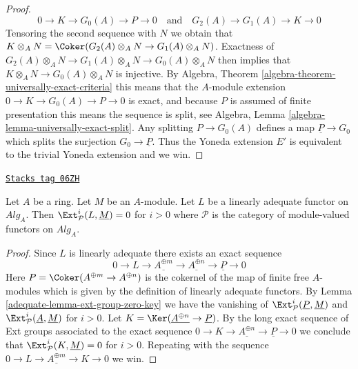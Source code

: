 \begin{proof}
$$
0 \to K \to G_0(A) \to P \to 0
\quad\text{and}\quad
G_2(A) \to G_1(A) \to K \to 0
$$
Tensoring the second sequence with $N$ we obtain that
$K \otimes_A N = \Coker(G_2(A) \otimes_A N \to G_1(A) \otimes_A N)$.
Exactness of $G_2(A) \otimes_A N \to G_1(A) \otimes_A N \to G_0(A) \otimes_A N$
then implies that $K \otimes_A N \to G_0(A) \otimes_A N$ is injective.
By
Algebra, Theorem \ref{algebra-theorem-universally-exact-criteria}
this means that the $A$-module extension $0 \to K \to G_0(A) \to P \to 0$
is exact, and because $P$ is assumed of finite presentation this means
the sequence is split, see
Algebra, Lemma \ref{algebra-lemma-universally-exact-split}.
Any splitting $P \to G_0(A)$ defines a map $\underline{P} \to G_0$
which splits the surjection $G_0 \to \underline{P}$. Thus the
Yoneda extension $E'$ is equivalent to the trivial Yoneda extension
and we win.
\end{proof}

\begin{lemma}
\label{adequate-lemma-ext-group-zero}
\href{https://stacks.math.columbia.edu/tag/06ZH}{\texttt{Stacks tag 06ZH}}

Let $A$ be a ring. Let $M$ be an $A$-module. Let $L$ be a linearly
adequate functor on $\textit{Alg}_A$. Then
$\Ext^i_\mathcal{P}(L, \underline{M}) = 0$
for $i > 0$ where $\mathcal{P}$ is the category of module-valued
functors on $\textit{Alg}_A$.
\end{lemma}

\begin{proof}

Since $L$ is linearly adequate there exists an exact sequence
$$
0 \to L \to \underline{A^{\oplus m}} \to \underline{A^{\oplus n}} \to
\underline{P} \to 0
$$
Here $P = \Coker(A^{\oplus m} \to A^{\oplus n})$ is the cokernel
of the map of finite free $A$-modules which is given by the definition
of linearly adequate functors. By
Lemma \ref{adequate-lemma-ext-group-zero-key}
we have the vanishing of
$\Ext^i_\mathcal{P}(\underline{P}, \underline{M})$
and
$\Ext^i_\mathcal{P}(\underline{A}, \underline{M})$
for $i > 0$.
Let $K = \Ker(\underline{A^{\oplus n}} \to \underline{P})$.
By the long exact sequence of Ext groups associated to the exact sequence
$0 \to K \to \underline{A^{\oplus n}} \to \underline{P} \to 0$
we conclude that
$\Ext^i_\mathcal{P}(K, \underline{M}) = 0$ for $i > 0$.
Repeating with the sequence
$0 \to L \to \underline{A^{\oplus m}} \to K \to 0$
we win.
\end{proof}


